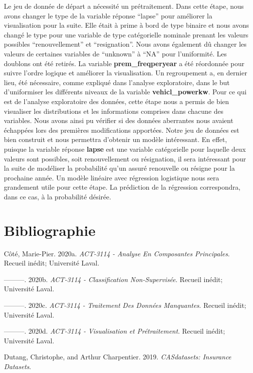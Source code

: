 \documentclass[
]{article}
\newlength{\cslhangindent}
\newenvironment{cslreferences}%
  {\setlength{\parindent}{0pt}%
  \everypar{\setlength{\hangindent}{\cslhangindent}}\ignorespaces}%
  {\par}
\begin{document}
Le jeu de donnée de départ a nécessité un prétraitement. Dans cette
étape, nous avons changer le type de la variable réponse ``lapse'' pour
améliorer la visualisation pour la suite. Elle était à prime à bord de
type binaire et nous avons changé le type pour une variable de type
catégorielle nominale prenant les valeurs possibles ``renouvellement''
et ``resignation''. Nous avons également dû changer les valeurs de
certaines variables de ``unknown'' à ``NA'' pour l'uniformité. Les
doublons ont été retirés. La variable \textbf{prem\_freqperyear} a été
réordonnée pour suivre l'ordre logique et améliorer la visualisation. Un
regroupement a, en dernier lieu, été nécessaire, comme expliqué dans
l'analyse exploratoire, dans le but d'uniformiser les différents niveaux
de la variable \textbf{vehicl\_powerkw}. Pour ce qui est de l'analyse
exploratoire des données, cette étape nous a permis de bien visualiser
les distributions et les informations comprises dans chacune des
variables. Nous avons ainsi pu vérifier si des données aberrantes nous
avaient échappées lors des premières modifications apportées. Notre jeu
de données est bien construit et nous permettra d'obtenir un modèle
intéressant. En effet, puisque la variable réponse \textbf{lapse} est
une variable catégorielle pour laquelle deux valeurs sont possibles,
soit renouvellement ou résignation, il sera intéressant pour la suite de
modéliser la probabilité qu'un assuré renouvelle ou résigne pour la
prochaine année. Un modèle linéaire avec régression logistique nous sera
grandement utile pour cette étape. La prédiction de la régression
correspondra, dans ce cas, à la probabilité désirée.

\newpage

\hypertarget{bibliographie}{%
\section{Bibliographie}\label{bibliographie}}

\hypertarget{refs}{}
\begin{cslreferences}
\leavevmode\hypertarget{ref-AnalyseComposantesPrincipales}{}%
Côté, Marie-Pier. 2020a. \emph{ACT-3114 - Analyse En Composantes
Principales}. Recueil inédit; Université Laval.

\leavevmode\hypertarget{ref-ClassificationNonSupervisuxe9e}{}%
---------. 2020b. \emph{ACT-3114 - Classification Non-Supervisée}.
Recueil inédit; Université Laval.

\leavevmode\hypertarget{ref-TraitementDonnesManquantes}{}%
---------. 2020c. \emph{ACT-3114 - Traitement Des Données Manquantes}.
Recueil inédit; Université Laval.

\leavevmode\hypertarget{ref-VisualisationPretraitement}{}%
---------. 2020d. \emph{ACT-3114 - Visualisation et Prétraitement}.
Recueil inédit; Université Laval.

\leavevmode\hypertarget{ref-CASdatasets}{}%
Dutang, Christophe, and Arthur Charpentier. 2019. \emph{CASdatasets:
Insurance Datasets}.
\end{cslreferences}
\end{document}

